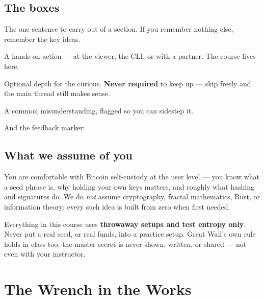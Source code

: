 \documentclass[a4paper,11pt]{report}
\begin{document}
\section*{The boxes}
\begin{keyidea}
The one sentence to carry out of a section. If you remember nothing else,
remember the key ideas.
\end{keyidea}
\begin{tryit}
A hands-on action — at the viewer, the CLI, or with a partner. The course lives
here.
\end{tryit}
\begin{deeper}
Optional depth for the curious. \textbf{Never required} to keep up — skip freely
and the main thread still makes sense.
\end{deeper}
\begin{pitfall}
A common misunderstanding, flagged so you can sidestep it.
\end{pitfall}
\noindent And the feedback marker:

\section*{What we assume of you}
You are comfortable with Bitcoin self-custody at the user level — you know what a
seed phrase is, why holding your own keys matters, and roughly what hashing and
signatures do. We do \emph{not} assume cryptography, fractal mathematics, Rust,
or information theory; every such idea is built from zero when first needed.

\begin{pitfall}
Everything in this course uses \textbf{throwaway setups and test entropy only}.
Never put a real seed, or real funds, into a practice setup. Great Wall's own
rule holds in class too: the master secret is never shown, written, or shared —
not even with your instructor.
\end{pitfall}

\tableofcontents

\chapter{The Wrench in the Works}
\end{document}
